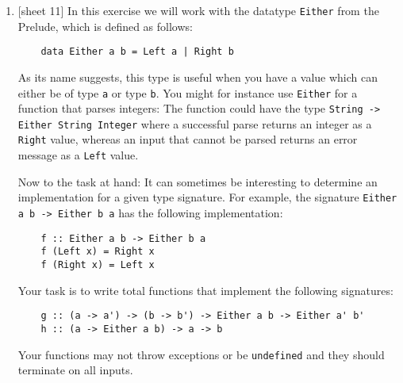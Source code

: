 \documentclass{article}
\def\code#1{\texttt{#1}}
\begin{document}
\begin{enumerate}
    \item {[sheet 11]} In this exercise we will work with the datatype \code{Either} from the Prelude, which is defined as follows:
        \begin{verbatim}
    data Either a b = Left a | Right b
        \end{verbatim}
        As its name suggests, this type is useful when you have a value which can either be of type \code{a} or type \code{b}. You might for instance use \code{Either} for a function that parses integers: The function could have the type \code{String -> Either String Integer} where a successful parse returns an integer as a \code{Right} value, whereas an input that cannot be parsed returns an error message as a \code{Left} value. \par
        Now to the task at hand: It can sometimes be interesting to determine an implementation for a given type signature. For example, the signature \code{Either a b -> Either b a} has the following implementation:
        \begin{verbatim}
    f :: Either a b -> Either b a
    f (Left x) = Right x
    f (Right x) = Left x
        \end{verbatim}
        Your task is to write total functions that implement the following signatures:
        \begin{verbatim}
    g :: (a -> a') -> (b -> b') -> Either a b -> Either a' b'
    h :: (a -> Either a b) -> a -> b
        \end{verbatim}
        Your functions may not throw exceptions or be \code{undefined} and they should terminate on all inputs.


\end{enumerate}
\end{document}
